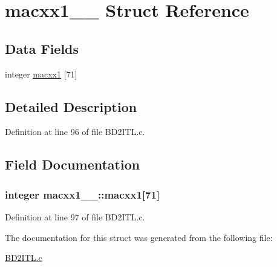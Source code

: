 \hypertarget{structmacxx1__1__}{}\section{macxx1\+\_\+\_\+ Struct Reference}
\label{structmacxx1__1__}
\subsection*{Data Fields}
\begin{DoxyCompactItemize}
\item 
integer \hyperlink{structmacxx1__1___a295dfe10e093e851970ee30ab8047cd0}{macxx1} \mbox{[}71\mbox{]}
\end{DoxyCompactItemize}


\subsection{Detailed Description}


Definition at line 96 of file B\+D2\+I\+T\+L.\+c.



\subsection{Field Documentation}
\subsubsection[{\texorpdfstring{macxx1}{macxx1}}]{\setlength{\rightskip}{0pt plus 5cm}integer macxx1\+\_\+\_\+\+::macxx1\mbox{[}71\mbox{]}}\hypertarget{structmacxx1__1___a295dfe10e093e851970ee30ab8047cd0}{}\label{structmacxx1__1___a295dfe10e093e851970ee30ab8047cd0}


Definition at line 97 of file B\+D2\+I\+T\+L.\+c.



The documentation for this struct was generated from the following file\+:\begin{DoxyCompactItemize}
\item 
\hyperlink{BD2ITL_8c}{B\+D2\+I\+T\+L.\+c}\end{DoxyCompactItemize}
